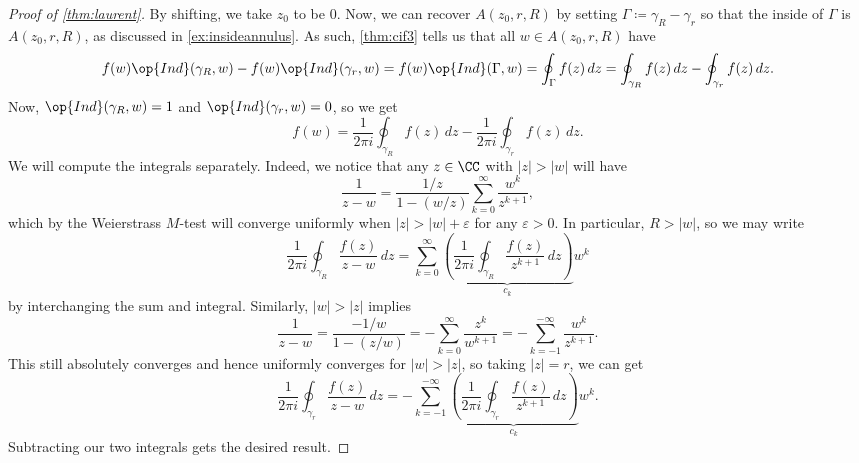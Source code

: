 \begin{proof}[Proof of \autoref{thm:laurent}]
	By shifting, we take $z_0$ to be $0$. Now, we can recover $A(z_0,r,R)$ by setting $\Gamma\coloneqq\gamma_R-\gamma_r$ so that the inside of $\Gamma$ is $A(z_0,r,R)$, as discussed in \autoref{ex:insideannulus}. As such, \autoref{thm:cif3} tells us that all $w\in A(z_0,r,R)$ have
	\[f(w)\op{Ind}(\gamma_R,w)-f(w)\op{Ind}(\gamma_r,w)=f(w)\op{Ind}(\Gamma,w)=\oint_\Gamma f(z)\,dz=\oint_{\gamma_R}f(z)\,dz-\oint_{\gamma_r}f(z)\,dz.\]
	Now, $\op{Ind}(\gamma_R,w)=1$ and $\op{Ind}(\gamma_r,w)=0$, so we get
	\[f(w)=\frac1{2\pi i}\oint_{\gamma_R}f(z)\,dz-\frac1{2\pi i}\oint_{\gamma_r}f(z)\,dz.\]
	We will compute the integrals separately. Indeed, we notice that any $z\in\CC$ with $|z|>|w|$ will have
	\[\frac1{z-w}=\frac{1/z}{1-(w/z)}\sum_{k=0}^\infty\frac{w^k}{z^{k+1}},\]
	which by the Weierstrass $M$-test will converge uniformly when $|z|>|w|+\varepsilon$ for any $\varepsilon>0$. In particular, $R>|w|$, so we may write
	\[\frac1{2\pi i}\oint_{\gamma_R}\frac{f(z)}{z-w}\,dz=\sum_{k=0}^\infty\underbrace{\left(\frac1{2\pi i}\oint_{\gamma_R}\frac{f(z)}{z^{k+1}}\,dz\right)}_{c_k}w^k\]
	by interchanging the sum and integral. Similarly, $|w|>|z|$ implies
	\[\frac1{z-w}=\frac{-1/w}{1-(z/w)}=-\sum_{k=0}^\infty\frac{z^k}{w^{k+1}}=-\sum_{k=-1}^{-\infty}\frac{w^k}{z^{k+1}}.\]
	This still absolutely converges and hence uniformly converges for $|w|>|z|$, so taking $|z|=r$, we can get
	\[\frac1{2\pi i}\oint_{\gamma_r}\frac{f(z)}{z-w}\,dz=-\sum_{k=-1}^{-\infty}\underbrace{\left(\frac1{2\pi i}\oint_{\gamma_r}\frac{f(z)}{z^{k+1}}\,dz\right)}_{c_k}w^k.\]
	Subtracting our two integrals gets the desired result.
\end{proof}